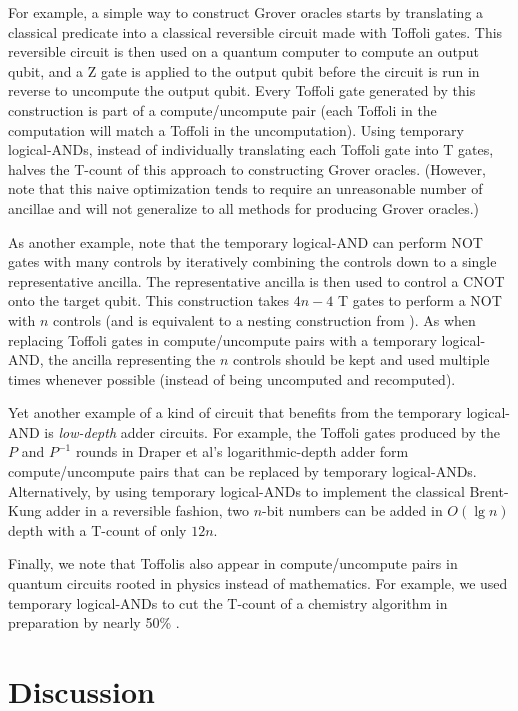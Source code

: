 \documentclass[twocolumn]{quantumarticle-customized}
\begin{document}
For example, a simple way to construct Grover oracles starts by translating a classical predicate into a classical reversible circuit made with Toffoli gates.
This reversible circuit is then used on a quantum computer to compute an output qubit, and a Z gate is applied to the output qubit before the circuit is run in reverse to uncompute the output qubit.
Every Toffoli gate generated by this construction is part of a compute/uncompute pair (each Toffoli in the computation will match a Toffoli in the uncomputation).
Using temporary logical-ANDs, instead of individually translating each Toffoli gate into T gates, halves the T-count of this approach to constructing Grover oracles.
(However, note that this naive optimization tends to require an unreasonable number of ancillae and will not generalize to all methods for producing Grover oracles.)

As another example, note that the temporary logical-AND can perform NOT gates with many controls by iteratively combining the controls down to a single representative ancilla.
The representative ancilla is then used to control a CNOT onto the target qubit.
This construction takes $4n-4$ T gates to perform a NOT with $n$ controls (and is equivalent to a nesting construction from \cite{Jones2013}).
As when replacing Toffoli gates in compute/uncompute pairs with a temporary logical-AND, the ancilla representing the $n$ controls should be kept and used multiple times whenever possible (instead of being uncomputed and recomputed).

Yet another example of a kind of circuit that benefits from the temporary logical-AND is {\em low-depth} adder circuits.
For example, the Toffoli gates produced by the $P$ and $P^{-1}$ rounds in Draper et al's logarithmic-depth adder \cite{Draper2004} form compute/uncompute pairs that can be replaced by temporary logical-ANDs.
Alternatively, by using temporary logical-ANDs to implement the classical Brent-Kung adder \cite{brent1982} in a reversible fashion, two $n$-bit numbers can be added in $O(\lg n)$ depth with a T-count of only $12n$.

Finally, we note that Toffolis also appear in compute/uncompute pairs in quantum circuits rooted in physics instead of mathematics.
For example, we used temporary logical-ANDs to cut the T-count of a chemistry algorithm in preparation by nearly 50\% \cite{Babbush2018}.


\section*{Discussion}
\end{document}
